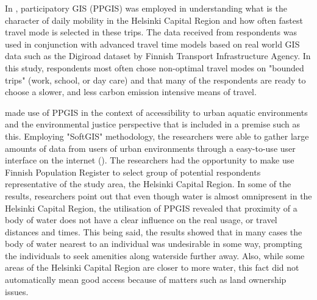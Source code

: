 In , participatory GIS (PPGIS) was employed in understanding what is the character of daily mobility in the Helsinki Capital Region and how often fastest travel mode is selected in these trips. The data received from respondents was used in conjunction with advanced travel time models based on real world GIS data such as the Digiroad dataset by Finnish Transport Infrastructure Agency. In this study, respondents most often chose non-optimal travel modes on "bounded trips" (work, school, or day care) and that many of the respondents are ready to choose a slower, and less carbon emission intensive means of travel.

 made use of PPGIS in the context of accessibility to urban aquatic environments and the environmental justice perspective that is included in a premise such as this. Employing "SoftGIS" methodology, the researchers were able to gather large amounts of data from users of urban environments through a easy-to-use user interface on the internet (\cite{Kytta2011}). The researchers had the opportunity to make use Finnish Population Register to select group of potential respondents representative of the study area, the Helsinki Capital Region. In some of the results, researchers point out that even though water is almost omnipresent in the Helsinki Capital Region, the utilisation of PPGIS revealed that proximity of a body of water does not have a clear influence on the real usage, or travel distances and times. This being said, the results showed that in many cases the body of water nearest to an individual was undesirable in some way, prompting the individuals to seek amenities along waterside further away. Also, while some areas of the Helsinki Capital Region are closer to more water, this fact did not automatically mean good access because of matters such as land ownership issues.